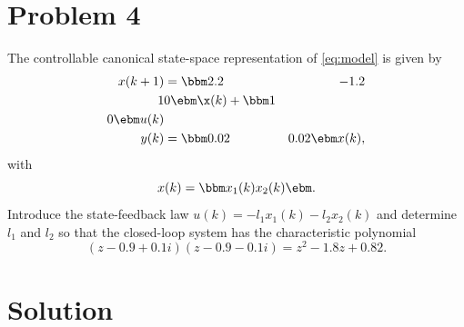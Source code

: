 \documentclass{scrartcl}
\begin{document}
\section*{Problem 4}
\label{sec:orgheadline4}
The controllable canonical state-space representation of \eqref{eq:model} is given by
\begin{equation}
\begin{split}
x(k+1) &= \bbm 2.2 & -1.2\\1 & 0\ebm \x(k) + \bbm 1\\0\ebm u(k)\\
y(k) &= \bbm 0.02 & 0.02 \ebm x(k),
\end{split}
\end{equation}
with 
\[ x(k) = \bbm x_1(k)\\x_2(k)\ebm. \]
Introduce the state-feedback law \(u(k) = -l_1x_1(k) -l_2x_2(k)\) and determine \(l_1\) and \(l_2\) so that the closed-loop system has the characteristic polynomial
\[ (z-0.9+0.1i)(z-0.9-0.1i) = z^2 -1.8z + 0.82. \]

\section*{Solution}
\label{sec:orgheadline9}
\end{document}
